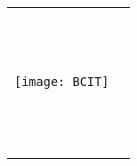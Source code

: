\begin{titlepage}
\null\vfill
\begin{center}
\large
\sffamily

\bigskip

{\huge\spacedlowsmallcaps{\myTitle} \\
}

\bigskip
    
\vspace{10cm}

\begin{tabular} {cc}
	\parbox{0.4\textwidth}{\texttt{[image: BCIT]}}
	&
	\parbox{0.6\textwidth}{{\Large\spacedlowsmallcaps{\mySubTitle}} \\ 
						{\normalsize
						\myName \hspace{2.5mm}\spacedlowsmallcaps\myStudentID \\
						\myEmail \\}

						{\normalsize
						\myProgram \\
						\mySpecialization \\
						\myTime}}
\end{tabular}
\end{center}
\vfill
\end{titlepage}



